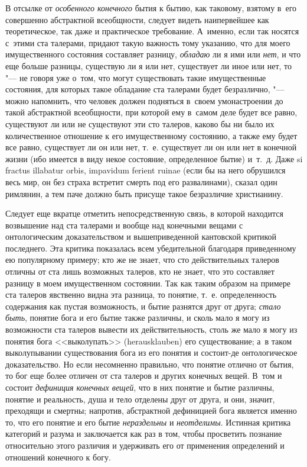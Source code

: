 В отсылке от {\em особенного конечного} бытия к бытию, как таковому, взятому
в~его совершенно абстрактной всеобщности, следует видеть наипервейшее как
теоретическое, так даже и практическое требование. А~именно, если так носятся
с~этими ста талерами, придают такую важность тому указанию, что для моего
имущественного состояния составляет разницу, {\em обладаю} ли я ими или
{\em нет}, и что еще больше разницы, существую ли я или нет, существует ли иное
или нет, то "--- не говоря уже о~том, что могут существовать такие
имущественные состояния, для которых такое обладание ста талерами будет
безразлично, "--- можно напомнить, что человек должен подняться в~своем
умонастроении до такой абстрактной всеобщности, при которой ему в~самом деле
будет все равно, существуют ли или не существуют эти сто талеров, каково бы ни
было их количественное отношение к его имущественному состоянию, а также ему
будет все равно, существует ли он или нет, т.~е. существует ли он или нет в
конечной жизни (ибо имеется в виду некое состояние, определенное бытие) и~т.~д.
Даже si fractus illabatur orbis, impavidum ferient ruinae (если бы на него
обрушился весь мир, он без страха встретит смерть под его развалинами), сказал
один римлянин, а тем паче должно быть присуще такое безразличие христианину.

Следует еще вкратце отметить непосредственную связь, в которой находится
возвышение над ста талерами и вообще над конечными вещами с онтологическим
доказательством и вышеприведенной кантовской критикой последнего. Эта критика
показалась всем убедительной благодаря приведенному ею популярному примеру; кто
же не знает, что сто действительных талеров отличны от ста лишь возможных
талеров, кто не знает, что это составляет разницу в моем имущественном
состоянии. Так как таким образом на примере ста талеров явственно видна эта
разница, то понятие, т.~е. определенность содержания как пустая возможность, и
бытие разнятся друг от друга; {\em стало быть}, понятие бога и его бытие также
различны, и сколь мало я могу из возможности ста талеров вывести их
действительность, столь же мало я могу из понятия бога <<выколупать>>
(heraus\-klau\-ben) его существование; а~в таком выколупывании существования
бога из его понятия и состоит-де онтологическое доказательство. Но если
несомненно правильно, что понятие отлично от бытия, то бог еще более
отличен от ста талеров и других конечных вещей. В~том и состоит
{\em дефиниция конечных вещей}, что в них понятие и бытие различны, понятие
и реальность, душа и тело отделены друг от друга, и они, значит, преходящи
и смертны; напротив, абстрактной дефиницией бога является именно то, что его
понятие и его бытие {\em нераздельны} и {\em неотделимы}. Истинная критика
категорий и разума и заключается как раз в том, чтобы просветить познание
относительно этого различия и удерживать его от применения определений и
отношений конечного к богу.\label{bkm:bm85b}

